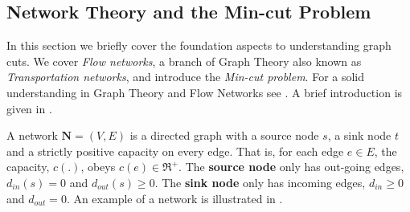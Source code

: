 
\subsection{Network Theory and the Min-cut Problem}
\label{sec:NetworkTheory}

In this section we briefly cover the foundation aspects to understanding graph cuts. We cover \textit{Flow networks}, a branch of Graph Theory also known as \textit{Transportation networks}, and introduce the \textit{Min-cut problem}. For a solid understanding in Graph Theory and Flow Networks see \citep{Deo1974,Bondy1976,Steen2010,Newman2010}. A brief introduction is given in .

\begin{definition}[Network]
	A network $\textbf{N} = (V,E)$ is a directed graph with a source node $s$, a sink node $t$ and a strictly positive capacity on every edge. That is, for each edge $e \in E$, the capacity, $c(.)$, obeys $c(e) \in \Re^{+}$.
	The \textbf{source node} only has out-going edges, $d_{in}(s) = 0$ and $d_{out}(s) \geq 0$. The \textbf{sink node} only has incoming edges, $d_{in} \geq 0$ and $d_{out} = 0$. An example of a network is illustrated in .
\end{definition}

